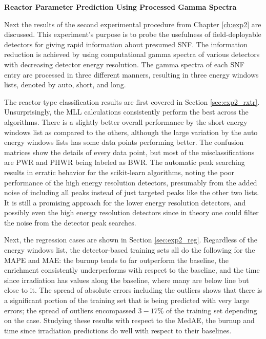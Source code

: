 \noindent \textbf{Reactor Parameter Prediction Using Processed Gamma Spectra}

Next the results of the second experimental procedure from Chapter
\ref{ch:exp2} are discussed.  This experiment's purpose is to probe the
usefulness of field-deployable detectors for giving rapid information about
presumed \gls{SNF}. The information reduction is achieved by using
computational gamma spectra of various detectors with decreasing detector
energy resolution.  The gamma spectra of each \gls{SNF} entry are
processed in three different manners, resulting in three energy windows lists,
denoted by auto, short, and long.  

The reactor type classification results are first covered in Section
\ref{sec:exp2_rxtr}.  Unsurprisingly, the \gls{MLL} calculations consistently
perform the best across the algorithms. There is a slightly better overall
performance by the short energy windows list as compared to the others,
although the large variation by the auto energy windows lists has some data
points performing better.  The confusion matrices show the details of every
data point, but most of the misclassifications are \gls{PWR} and \gls{PHWR} being
labeled as \gls{BWR}.  The automatic peak searching results in erratic behavior
for the scikit-learn algorithms, noting the poor performance of the high energy
resolution detectors, presumably from the added noise of including all peaks
instead of just targeted peaks like the other two lists.  It is still a
promising approach for the lower energy resolution detectors, and possibly even
the high energy resolution detectors since in theory one could filter the noise
from the detector peak searches. 

Next, the regression cases are shown in Section \ref{sec:exp2_reg}.  Regardless
of the energy windows list, the detector-based training sets all do the
following for the \gls{MAPE} and \gls{MAE}: the burnup tends to far outperform
the baseline, the enrichment consistently underperforms with respect to the
baseline, and the time since irradiation has values along the baseline, where
many are below line but close to it.  The spread of absolute errors including
the outliers shows that there is a significant portion of the training set that
is being predicted with very large errors; the spread of outliers encompassed
$3-17\%$ of the training set depending on the case.  Studying these results
with respect to the \gls{MedAE}, the burnup and time since irradiation
predictions do well with respect to their baselines. 

